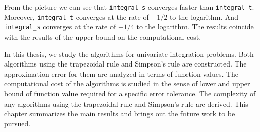 \documentclass{iitthesis}
\theoremstyle{definition}
\theoremstyle{remark}
\begin{document}
From the picture we can see that {\tt integral\_s} converges faster than {\tt integral\_t}. Moreover, {\tt integral\_t} converges at the rate of $-1/2$ to the logarithm. And {\tt integral\_s} converges at the rate of $-1/4$ to the logarithm. The results coincide with the results of the upper bound on the computational cost.



In this thesis, we study the algorithms for univariate integration problems. Both algorithms using the trapezoidal rule and Simpson's rule are constructed. The approximation error for them are analyzed in terms of function values. The computational cost of the algorithms is studied in the sense of lower and upper bound of function value required for a specific error tolerance. The complexity of any algorithms using the trapezoidal rule and Simpson's rule are derived. This chapter summarizes the main results and brings out the future work to be pursued.


\end{document}
